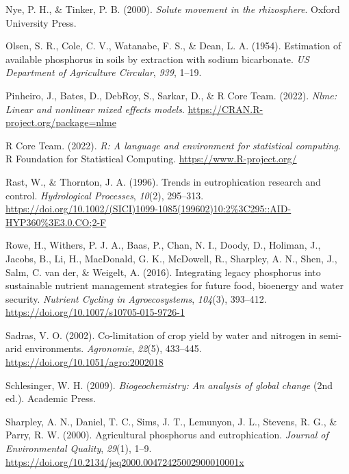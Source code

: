 \documentclass[
  a4paper,
]{article}
\newlength{\cslhangindent}
\newenvironment{CSLReferences}[2] %
 {\begin{list}{}{%
  \setlength{\itemindent}{0pt}
  \setlength{\leftmargin}{0pt}
  \setlength{\parsep}{0pt}
  \ifodd #1
   \setlength{\leftmargin}{\cslhangindent}
   \setlength{\itemindent}{-1\cslhangindent}
  \fi
  \setlength{\itemsep}{#2\baselineskip}}}
 {\end{list}}
\begin{document}
\begin{CSLReferences}{1}{0}
Nye, P. H., \& Tinker, P. B. (2000). \emph{Solute movement in the
rhizosphere}. Oxford University Press.

Olsen, S. R., Cole, C. V., Watanabe, F. S., \& Dean, L. A. (1954).
Estimation of available phosphorus in soils by extraction with sodium
bicarbonate. \emph{US Department of Agriculture Circular}, \emph{939},
1--19.

Pinheiro, J., Bates, D., DebRoy, S., Sarkar, D., \& R Core Team. (2022).
\emph{Nlme: Linear and nonlinear mixed effects models}.
\url{https://CRAN.R-project.org/package=nlme}

R Core Team. (2022). \emph{R: A language and environment for statistical
computing}. R Foundation for Statistical Computing.
\url{https://www.R-project.org/}

Rast, W., \& Thornton, J. A. (1996). Trends in eutrophication research
and control. \emph{Hydrological Processes}, \emph{10}(2), 295--313.
\url{https://doi.org/10.1002/(SICI)1099-1085(199602)10:2\%3C295::AID-HYP360\%3E3.0.CO;2-F}

Rowe, H., Withers, P. J. A., Baas, P., Chan, N. I., Doody, D., Holiman,
J., Jacobs, B., Li, H., MacDonald, G. K., McDowell, R., Sharpley, A. N.,
Shen, J., Salm, C. van der, \& Weigelt, A. (2016). Integrating legacy
phosphorus into sustainable nutrient management strategies for future
food, bioenergy and water security. \emph{Nutrient Cycling in
Agroecosystems}, \emph{104}(3), 393--412.
\url{https://doi.org/10.1007/s10705-015-9726-1}

Sadras, V. O. (2002). Co-limitation of crop yield by water and nitrogen
in semi-arid environments. \emph{Agronomie}, \emph{22}(5), 433--445.
\url{https://doi.org/10.1051/agro:2002018}

Schlesinger, W. H. (2009). \emph{Biogeochemistry: An analysis of global
change} (2nd ed.). Academic Press.

Sharpley, A. N., Daniel, T. C., Sims, J. T., Lemunyon, J. L., Stevens,
R. G., \& Parry, R. W. (2000). Agricultural phosphorus and
eutrophication. \emph{Journal of Environmental Quality}, \emph{29}(1),
1--9. \url{https://doi.org/10.2134/jeq2000.00472425002900010001x}


\end{CSLReferences}
\end{document}
